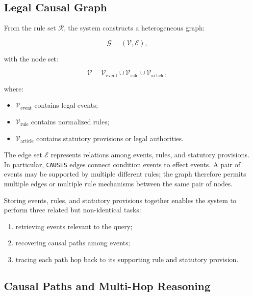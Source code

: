 \subsection{Legal Causal Graph}

From the rule set \(\mathcal{R}\), the system constructs a heterogeneous
graph:

\begin{equation}
\mathcal{G}
=
\left(
    \mathcal{V},
    \mathcal{E}
\right),
\end{equation}

with the node set:

\begin{equation}
\mathcal{V}
=
\mathcal{V}_{\mathrm{event}}
\cup
\mathcal{V}_{\mathrm{rule}}
\cup
\mathcal{V}_{\mathrm{article}},
\end{equation}

where:

\begin{itemize}
    \item \(\mathcal{V}_{\mathrm{event}}\) contains legal events;
    \item \(\mathcal{V}_{\mathrm{rule}}\) contains normalized rules;
    \item \(\mathcal{V}_{\mathrm{article}}\) contains statutory provisions
    or legal authorities.
\end{itemize}

The edge set \(\mathcal{E}\) represents relations among events, rules, and
statutory provisions. In particular, \texttt{CAUSES} edges connect condition
events to effect events. A pair of events may be supported by multiple
different rules; the graph therefore permits multiple edges or multiple rule
mechanisms between the same pair of nodes.

Storing events, rules, and statutory provisions together enables the system
to perform three related but non-identical tasks:

\begin{enumerate}
    \item retrieving events relevant to the query;
    \item recovering causal paths among events;
    \item tracing each path hop back to its supporting rule and statutory
    provision.
\end{enumerate}

\subsection{Causal Paths and Multi-Hop Reasoning}

